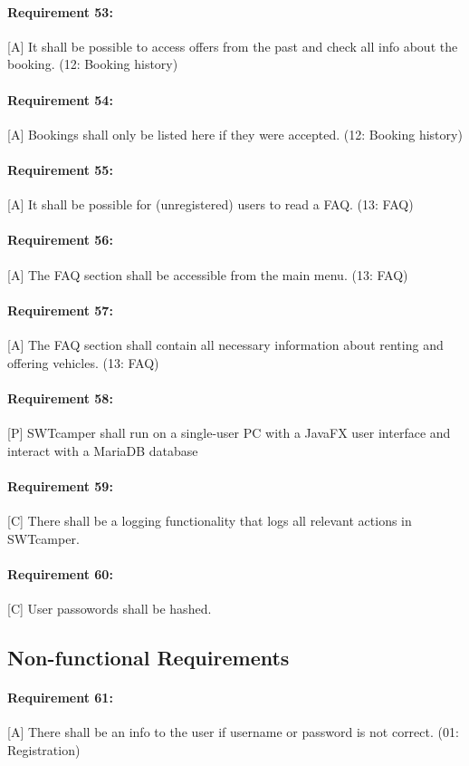 \paragraph{Requirement 53:} [A] It shall be possible to access offers from the past and check all info about the booking. (12: Booking history)
\paragraph{Requirement 54:} [A] Bookings shall only be listed here if they were accepted. (12: Booking history)

\paragraph{Requirement 55:} [A] It shall be possible for (unregistered) users to read a FAQ. (13: FAQ)
\paragraph{Requirement 56:} [A] The FAQ section shall be accessible from the main menu. (13: FAQ)
\paragraph{Requirement 57:} [A] The FAQ section shall contain all necessary information about renting and offering vehicles. (13: FAQ)

\paragraph{Requirement 58:} [P] SWTcamper shall run on a single-user PC with a JavaFX user interface and interact with a MariaDB database

\paragraph{Requirement 59:} [C] There shall be a logging functionality that logs all relevant actions in SWTcamper.
\paragraph{Requirement 60:} [C] User passowords shall be hashed.


\subsection{Non-functional Requirements}

\paragraph{Requirement 61:} [A] There shall be an info to the user if username or password is not correct. (01: Registration)
